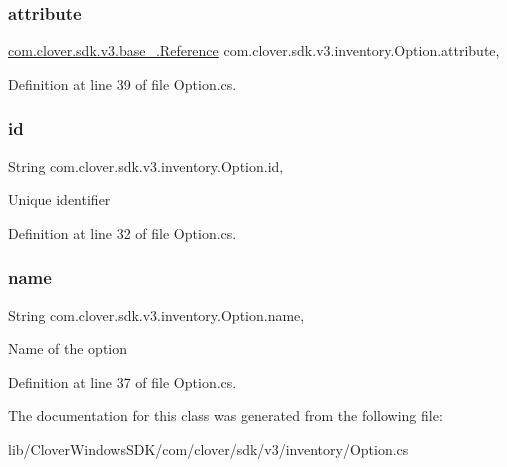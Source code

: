 \subsubsection{\texorpdfstring{attribute}{attribute}}
{\footnotesize\ttfamily \hyperlink{classcom_1_1clover_1_1sdk_1_1v3_1_1base___1_1_reference}{com.\+clover.\+sdk.\+v3.\+base\+\_\+.\+Reference} com.\+clover.\+sdk.\+v3.\+inventory.\+Option.\+attribute\hspace{0.3cm}{\ttfamily [get]}, {\ttfamily [set]}}



Definition at line 39 of file Option.\+cs.

\mbox{\label{classcom_1_1clover_1_1sdk_1_1v3_1_1inventory_1_1_option_a1935df102ba458e526af39bbaedd0f84}} 
\subsubsection{\texorpdfstring{id}{id}}
{\footnotesize\ttfamily String com.\+clover.\+sdk.\+v3.\+inventory.\+Option.\+id\hspace{0.3cm}{\ttfamily [get]}, {\ttfamily [set]}}



Unique identifier 



Definition at line 32 of file Option.\+cs.

\mbox{\label{classcom_1_1clover_1_1sdk_1_1v3_1_1inventory_1_1_option_a1e65b5dc17e96ddce0588e7908eb6e45}} 
\subsubsection{\texorpdfstring{name}{name}}
{\footnotesize\ttfamily String com.\+clover.\+sdk.\+v3.\+inventory.\+Option.\+name\hspace{0.3cm}{\ttfamily [get]}, {\ttfamily [set]}}



Name of the option 



Definition at line 37 of file Option.\+cs.



The documentation for this class was generated from the following file\+:\begin{DoxyCompactItemize}
\item 
lib/\+Clover\+Windows\+S\+D\+K/com/clover/sdk/v3/inventory/Option.\+cs\end{DoxyCompactItemize}
